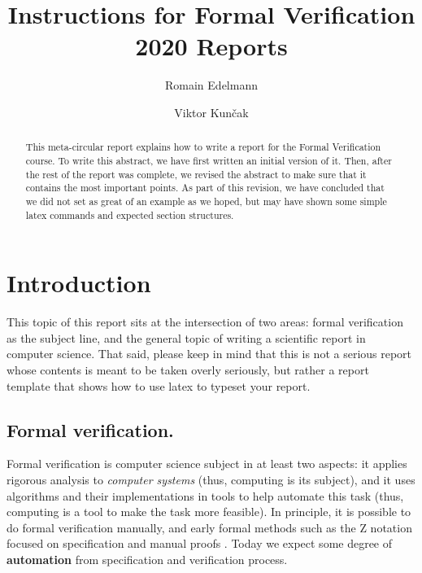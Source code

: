 \documentclass[a4paper,UKenglish,cleveref, autoref, thm-restate]{lipics-v2021}
\title{Instructions for Formal Verification 2020 Reports} %
\author{Romain Edelmann}{EPFL}{romain.edelmann@epfl.ch}{}{}
\author{Viktor Kun\v{c}ak}{EPFL}{viktor.kuncak@epfl.ch}{https://orcid.org/0000-0001-7044-9522}{}
\begin{document}
\maketitle

\begin{abstract}
  This meta-circular report explains how to write a report
  for the Formal Verification course.  To write this
  abstract, we have first written an initial version of
  it. Then, after the rest of the report was complete, we
  revised the abstract to make sure that it contains the
  most important points. As part of this revision, we have
  concluded that we did not set as great of an example as we
  hoped, but may have shown some simple latex commands and
  expected section structures.
\end{abstract}

\lstset{language=scala}


\section{Introduction}
\label{sec:intro}

This topic of this report sits at the intersection of two
areas: formal verification as the subject line, and the
general topic of writing a scientific report in computer
science. That said, please keep in mind that this is not a
serious report whose contents is meant to be taken overly
seriously, but rather a report template that shows how to
use latex to typeset your report.

\subsection{Formal verification.}
Formal verification is computer science subject in at least
two aspects: it applies rigorous analysis to
\emph{computer systems} %
(thus, computing is its subject), and it uses
algorithms and their implementations in tools to help
automate this task (thus, computing is a tool to make the
task more feasible). In principle, it is possible to do
formal verification manually, and early formal methods such
as the Z notation focused on specification and manual proofs
\cite{DBLP:books/daglib/0072139}.
Today we expect some
degree of \textbf{automation} from specification and verification
process. %
\end{document}
